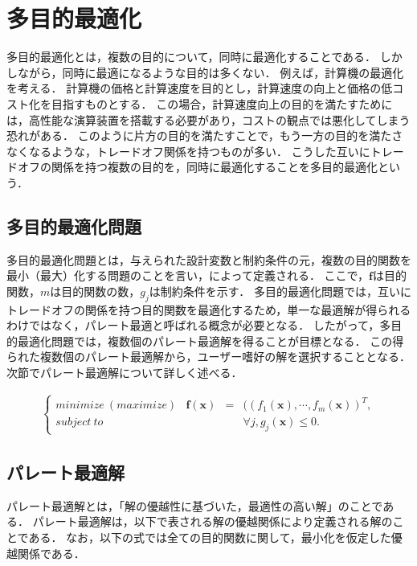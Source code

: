 \documentclass[../main/main]{subfiles}
\begin{document}
\chapter{多目的最適化}


\quad 多目的最適化とは，複数の目的について，同時に最適化することである．
しかしながら，同時に最適になるような目的は多くない．
例えば，計算機の最適化を考える．
計算機の価格と計算速度を目的とし，計算速度の向上と価格の低コスト化を目指すものとする．
この場合，計算速度向上の目的を満たすためには，高性能な演算装置を搭載する必要があり，コストの観点では悪化してしまう恐れがある．
このように片方の目的を満たすことで，もう一方の目的を満たさなくなるような，トレードオフ関係を持つものが多い．
こうした互いにトレードオフの関係を持つ複数の目的を，同時に最適化することを多目的最適化という．

\section{多目的最適化問題}
\quad 多目的最適化問題とは，与えられた設計変数と制約条件の元，複数の目的関数を最小（最大）化する問題のことを言い，によって定義される．
ここで，$\bm f$は目的関数，$m$は目的関数の数，$g_j$は制約条件を示す．
多目的最適化問題では，互いにトレードオフの関係を持つ目的関数を最適化するため，単一な最適解が得られるわけではなく，パレート最適と呼ばれる概念が必要となる．
したがって，多目的最適化問題では，複数個のパレート最適解を得ることが目標となる．
この得られた複数個のパレート最適解から，ユーザー嗜好の解を選択することとなる．
次節でパレート最適解について詳しく述べる．

\begin{eqnarray}
\left\{
\begin{array}{rccl}
minimize \ (maximize) & \bm f (\bm x) & = & ((f_1(\bm x), \cdots, f_m (\bm x))^T,\\
subject \ to & & & \forall j, g_j (\bm x) \leq 0.
\end{array}
\right.
\label{moea_dif}
\end{eqnarray}

\vspace{0.1in}


\section{パレート最適解}
\quad パレート最適解とは，「解の優越性に基づいた，最適性の高い解」のことである．
パレート最適解は，以下で表される解の優越関係により定義される解のことである．
なお，以下の式では全ての目的関数に関して，最小化を仮定した優越関係である．
\end{document}
